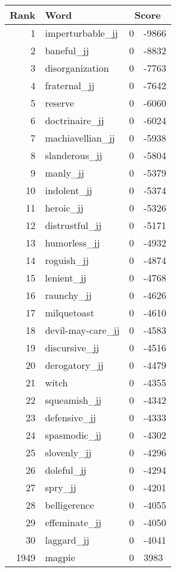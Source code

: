 \begin{longtable}[!htbp]{| rlr@{.}l |}
    \hline
    \textbf{Rank} & \textbf{Word} & \multicolumn{2}{c|}{\textbf{Score}} \\
    \hline
    \endhead
    1 & imperturbable\_jj & 0 & -9866 \\
    2 & baneful\_jj & 0 & -8832 \\
    3 & disorganization & 0 & -7763 \\
    4 & fraternal\_jj & 0 & -7642 \\
    5 & reserve & 0 & -6060 \\
    6 & doctrinaire\_jj & 0 & -6024 \\
    7 & machiavellian\_jj & 0 & -5938 \\
    8 & slanderous\_jj & 0 & -5804 \\
    9 & manly\_jj & 0 & -5379 \\
    10 & indolent\_jj & 0 & -5374 \\
    11 & heroic\_jj & 0 & -5326 \\
    12 & distrustful\_jj & 0 & -5171 \\
    13 & humorless\_jj & 0 & -4932 \\
    14 & roguish\_jj & 0 & -4874 \\
    15 & lenient\_jj & 0 & -4768 \\
    16 & raunchy\_jj & 0 & -4626 \\
    17 & milquetoast & 0 & -4610 \\
    18 & devil-may-care\_jj & 0 & -4583 \\
    19 & discursive\_jj & 0 & -4516 \\
    20 & derogatory\_jj & 0 & -4479 \\
    21 & witch & 0 & -4355 \\
    22 & squeamish\_jj & 0 & -4342 \\
    23 & defensive\_jj & 0 & -4333 \\
    24 & spasmodic\_jj & 0 & -4302 \\
    25 & slovenly\_jj & 0 & -4296 \\
    26 & doleful\_jj & 0 & -4294 \\
    27 & spry\_jj & 0 & -4201 \\
    28 & belligerence & 0 & -4055 \\
    29 & effeminate\_jj & 0 & -4050 \\
    30 & laggard\_jj & 0 & -4041 \\
    1949 & magpie & 0 & 3983 \\

\end{longtable}

